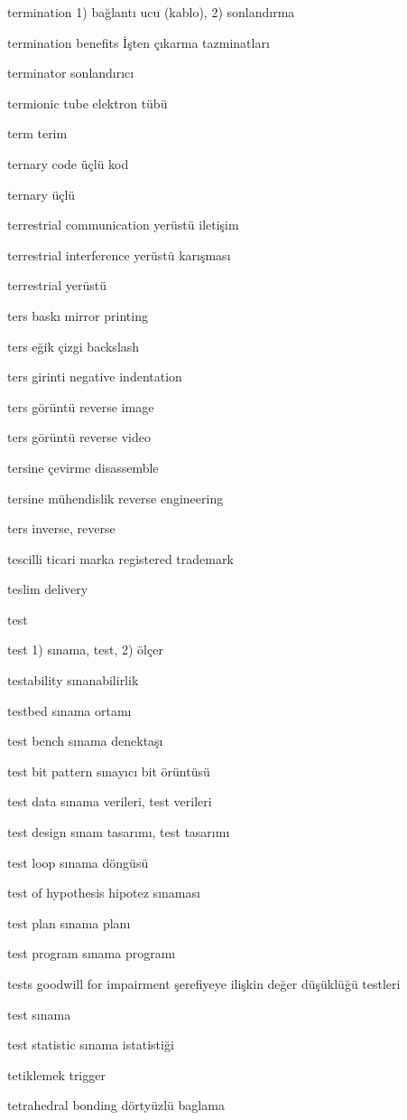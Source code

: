 \documentclass[12pt,fleqn]{article}\usepackage{../../common}
\begin{document}
termination 1) bağlantı ucu (kablo), 2) sonlandırma

termination benefits İşten çıkarma tazminatları

terminator sonlandırıcı

termionic tube elektron tübü

term terim

ternary code üçlü kod

ternary üçlü

terrestrial communication yerüstü iletişim

terrestrial interference yerüstü karışması

terrestrial yerüstü

ters baskı mirror printing

ters eğik çizgi backslash

ters girinti negative indentation

ters görüntü reverse image

ters görüntü reverse video

tersine çevirme disassemble

tersine mühendislik reverse engineering

ters inverse, reverse

tescilli ticari marka registered trademark

teslim delivery

test

test 1) sınama, test, 2) ölçer

testability sınanabilirlik

testbed sınama ortamı

test bench sınama denektaşı

test bit pattern sınayıcı bit örüntüsü

test data sınama verileri, test verileri

test design sınam tasarımı, test tasarımı

test loop sınama döngüsü

test of hypothesis hipotez sınaması

test plan sınama planı

test program sınama programı

tests goodwill for impairment şerefiyeye ilişkin değer düşüklüğü testleri

test sınama

test statistic sınama istatistiği

tetiklemek trigger

tetrahedral bonding dörtyüzlü baglama
\end{document}
